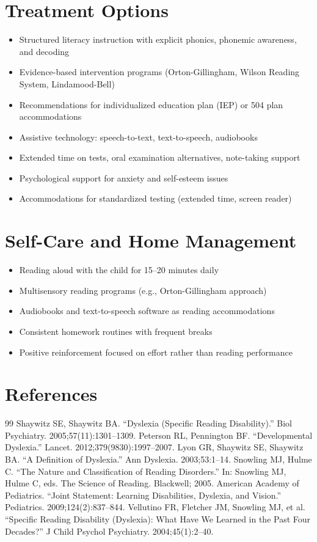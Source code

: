 \section*{Treatment Options}
\begin{itemize}
  \item Structured literacy instruction with explicit phonics, phonemic awareness, and decoding
  \item Evidence-based intervention programs (Orton-Gillingham, Wilson Reading System, Lindamood-Bell)
  \item Recommendations for individualized education plan (IEP) or 504 plan accommodations
  \item Assistive technology: speech-to-text, text-to-speech, audiobooks
  \item Extended time on tests, oral examination alternatives, note-taking support
  \item Psychological support for anxiety and self-esteem issues
  \item Accommodations for standardized testing (extended time, screen reader)
\end{itemize}

\section*{Self-Care and Home Management}
\begin{itemize}
  \item Reading aloud with the child for 15--20 minutes daily
  \item Multisensory reading programs (e.g., Orton-Gillingham approach)
  \item Audiobooks and text-to-speech software as reading accommodations
  \item Consistent homework routines with frequent breaks
  \item Positive reinforcement focused on effort rather than reading performance
\end{itemize}

\section*{References}
\begin{thebibliography}{99}
 Shaywitz SE, Shaywitz BA. ``Dyslexia (Specific Reading Disability).'' Biol Psychiatry. 2005;57(11):1301--1309.
 Peterson RL, Pennington BF. ``Developmental Dyslexia.'' Lancet. 2012;379(9830):1997--2007.
 Lyon GR, Shaywitz SE, Shaywitz BA. ``A Definition of Dyslexia.'' Ann Dyslexia. 2003;53:1--14.
 Snowling MJ, Hulme C. ``The Nature and Classification of Reading Disorders.'' In: Snowling MJ, Hulme C, eds. The Science of Reading. Blackwell; 2005.
 American Academy of Pediatrics. ``Joint Statement: Learning Disabilities, Dyslexia, and Vision.'' Pediatrics. 2009;124(2):837--844.
 Vellutino FR, Fletcher JM, Snowling MJ, et al. ``Specific Reading Disability (Dyslexia): What Have We Learned in the Past Four Decades?'' J Child Psychol Psychiatry. 2004;45(1):2--40.
\end{thebibliography}
